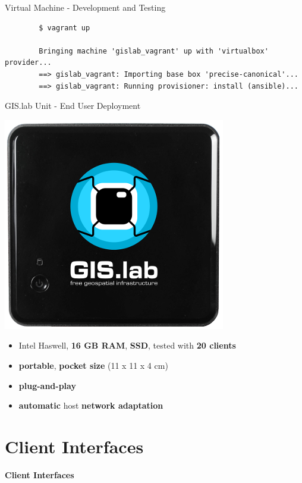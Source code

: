 \documentclass[12pt]{beamer}
\begin{document}
\begin{frame}[fragile]{Virtual Machine - Development and Testing}
   \lstset{language=sh}
	\begin{lstlisting}
		$ vagrant up

		Bringing machine 'gislab_vagrant' up with 'virtualbox' provider...
		==> gislab_vagrant: Importing base box 'precise-canonical'...
		==> gislab_vagrant: Running provisioner: install (ansible)...
	\end{lstlisting}
\end{frame}

\begin{frame}{GIS.lab Unit - End User Deployment}
	\begin{center}
		\includegraphics[keepaspectratio=true,height=0.5\textheight]{images/gislab-unit.png}
	\end{center}
	\begin{itemize}
		\item Intel Haswell, \textbf{16 GB RAM}, \textbf{SSD}, tested with \textbf{20 clients}
		\item \textbf{portable}, \textbf{pocket size} (11 x 11 x 4 cm)
		\item \textbf{plug-and-play}
		\item \textbf{automatic} host \textbf{network adaptation}
	\end{itemize}
\end{frame}


\section{Client Interfaces}
\begin{frame}
	\begin{center}
		\LARGE\textbf{Client Interfaces}
	\end{center}
\end{frame}
\end{document}
